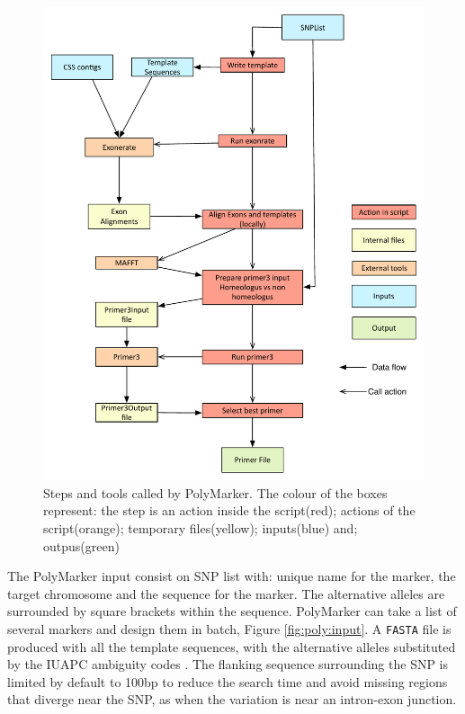 \begin{figure}
\includegraphics[width=1\textwidth]{PolyMarker/Figures/pipeline.pdf}
        \caption{Steps and tools called by PolyMarker. The colour of the boxes represent: the step is an action inside the script(red); actions of the script(orange); temporary files(yellow); inputs(blue) and; outpus(green)}
        \label{fig:poly:pipeline}
\end{figure}

The PolyMarker input consist on SNP list with: unique name for the marker, the target chromosome and the sequence for the marker. 
The alternative alleles are surrounded by square brackets within the sequence. PolyMarker can take a list of several markers and design them in batch, Figure \ref{fig:poly:input}. 
A \texttt{FASTA} file is produced with all the template sequences, with the alternative alleles substituted by the IUAPC ambiguity codes \citep{Cornish-Bowden1985}. 
The flanking sequence surrounding the SNP is limited by default to 100bp to reduce the search time and avoid missing regions that diverge near the SNP, as when the variation is near an intron-exon junction. 

